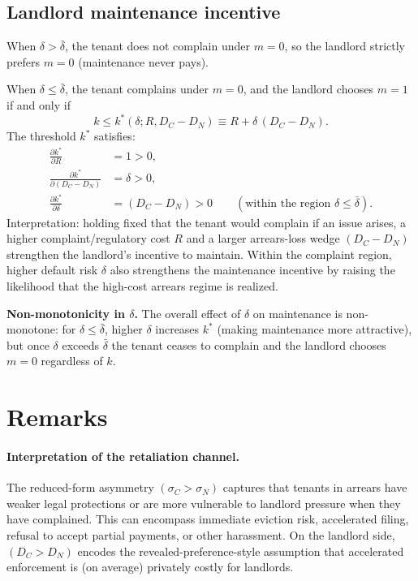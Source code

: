 \documentclass[11pt]{article}
\begin{document}
\subsection{Landlord maintenance incentive}

When $\delta > \bar\delta$, the tenant does not complain under $m=0$, so the landlord strictly prefers $m=0$ (maintenance never pays).

When $\delta \le \bar\delta$, the tenant complains under $m=0$, and the landlord chooses $m=1$ if and only if
\begin{equation}
  k \le k^*(\delta;R,D_C-D_N) \equiv R + \delta\,(D_C-D_N).
  \label{eq:kstar}
\end{equation}
The threshold $k^*$ satisfies:
\begin{align}
  \frac{\partial k^*}{\partial R} &= 1 > 0, \\
  \frac{\partial k^*}{\partial (D_C-D_N)} &= \delta > 0, \\
  \frac{\partial k^*}{\partial \delta} &= (D_C-D_N) > 0 \qquad (\text{within the region } \delta \le \bar\delta).
\end{align}
Interpretation: holding fixed that the tenant would complain if an issue arises, a higher complaint/regulatory cost $R$ and a larger arrears-loss wedge $(D_C-D_N)$ strengthen the landlord's incentive to maintain. Within the complaint region, higher default risk $\delta$ also strengthens the maintenance incentive by raising the likelihood that the high-cost arrears regime is realized.

\medskip
\noindent\textbf{Non-monotonicity in $\delta$.} The overall effect of $\delta$ on maintenance is non-monotone: for $\delta \le \bar\delta$, higher $\delta$ increases $k^*$ (making maintenance more attractive), but once $\delta$ exceeds $\bar\delta$ the tenant ceases to complain and the landlord chooses $m=0$ regardless of $k$.

\section{Remarks}

\paragraph{Interpretation of the retaliation channel.}
The reduced-form asymmetry $(\sigma_C>\sigma_N)$ captures that tenants in arrears have weaker legal protections or are more vulnerable to landlord pressure when they have complained. This can encompass immediate eviction risk, accelerated filing, refusal to accept partial payments, or other harassment. On the landlord side, $(D_C>D_N)$ encodes the revealed-preference-style assumption that accelerated enforcement is (on average) privately costly for landlords.
\end{document}
